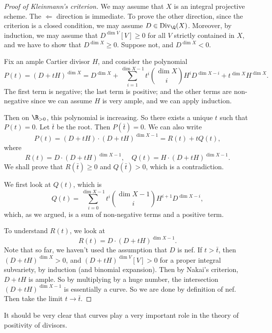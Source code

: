 \documentclass[a4paper]{article}
\newcommand\Div{\mathrm{Div}}
\begin{document}
\begin{proof}[Proof of Kleinmann's criterion]
  We may assume that $X$ is an integral projective scheme. The $\Leftarrow$ direction is immediate. To prove the other direction, since the criterion is a closed condition, we may assume $D \in \Div_\Q(X)$. Moreover, by induction, we may assume that $D^{\dim V}[V] \geq 0$ for all $V$ strictly contained in $X$, and we have to show that $D^{\dim X} \geq 0$. Suppose not, and $D^{\dim X} < 0$.

  Fix an ample Cartier divisor $H$, and consider the polynomial
  \[
    P(t) = (D + tH)^{\dim X} = D^{\dim X} + \sum_{i = 1}^{\dim X - 1} t^i \binom{\dim X}{i} H^i D^{\dim X - i} + t^{\dim X} H^{\dim X}.
  \]
  The first term is negative; the last term is positive; and the other terms are non-negative since we can assume $H$ is very ample, and we can apply induction.

  Then on $\R_{>0}$, this polynomial is increasing. So there exists a unique $t$ such that $P(t) = 0$. Let $\bar{t}$ be the root. Then $P(\bar{t}) = 0$. We can also write
  \[
    P(t) = (D + tH) \cdot (D + tH)^{\dim X - 1} = R(t) + t Q(t),
  \]
  where
  \[
    R(t) = D \cdot (D + tH)^{\dim X - 1},\quad Q(t) = H \cdot (D + tH)^{\dim X - 1}.
  \]
  We shall prove that $R(\bar{t}) \geq 0$ and $Q(\bar{t}) > 0$, which is a contradiction.

  We first look at $Q(t)$, which is
  \[
    Q(t) = \sum_{i = 0}^{\dim X - 1} t^i \binom{\dim X - 1}{i} H^{i + 1} D^{\dim X - i},
  \]
  which, as we argued, is a sum of non-negative terms and a positive term.

  To understand $R(t)$, we look at
  \[
    R(t) = D \cdot (D + tH)^{\dim X - 1}.
  \]
  Note that so far, we haven't used the assumption that $D$ is nef. If $t > \bar{t}$, then $(D + tH)^{\dim X} > 0$, and $(D + tH)^{\dim V}[V] > 0$ for a proper integral subvariety, by induction (and binomial expansion). Then by Nakai's criterion, $D + tH$ is ample. So by multiplying by a huge number, the intersection $(D + tH)^{\dim X - 1}$ is essentially a curve. So we are done by definition of nef. Then take the limit $t \to \bar{t}$.
\end{proof}

It should be very clear that curves play a very important role in the theory of positivity of divisors.
\end{document}
